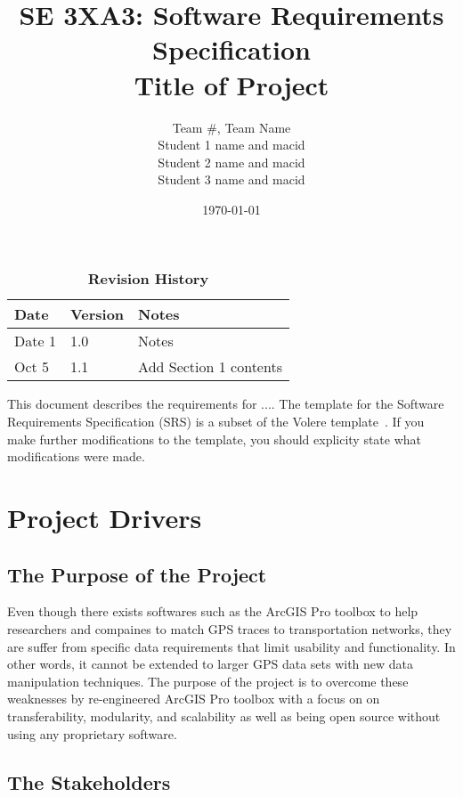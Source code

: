 \documentclass[12pt, titlepage]{article}
\title{SE 3XA3: Software Requirements Specification\\Title of Project}
\author{Team \#, Team Name
		\\ Student 1 name and macid
		\\ Student 2 name and macid
		\\ Student 3 name and macid
}
\date{\today}
\begin{document}
\maketitle

\tableofcontents
\listoftables
\listoffigures

\begin{table}[bp]
\caption{\bf Revision History}
\begin{tabularx}{\textwidth}{p{3cm}p{2cm}X}
\toprule {\bf Date} & {\bf Version} & {\bf Notes}\\
\midrule
Date 1 & 1.0 & Notes\\
Oct 5 & 1.1 & Add Section 1 contents\\
\bottomrule
\end{tabularx}
\end{table}

\newpage


This document describes the requirements for ....  The template for the Software
Requirements Specification (SRS) is a subset of the Volere
template~\citep{RobertsonAndRobertson2012}.  If you make further modifications
to the template, you should explicity state what modifications were made.

\section{Project Drivers}

\subsection{The Purpose of the Project}
Even though there exists softwares such as the ArcGIS Pro toolbox to help researchers and compaines to match GPS traces to transportation networks, they are suffer from specific data requirements that limit usability and functionality. In other words, it cannot be extended to larger GPS data sets with new data manipulation techniques. The purpose of the project is to overcome these weaknesses by re-engineered ArcGIS Pro toolbox with a focus on on transferability, modularity, and scalability as well as being open source without using any proprietary software.

\subsection{The Stakeholders}
\end{document}
